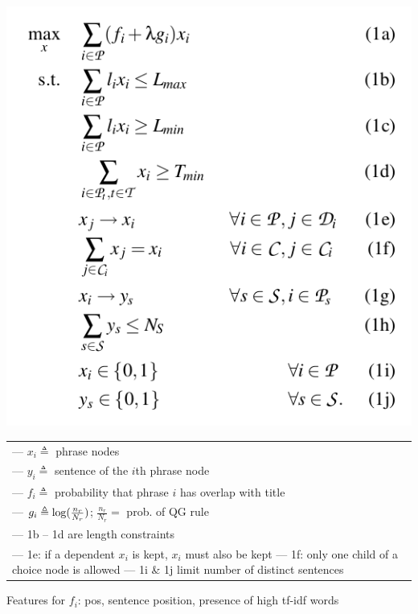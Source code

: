 \documentclass[xcolor={table}]{beamer}
\begin{document}
\begin{frame}[t]{\cite{woodsend2010generation}}
      \includegraphics[scale=.23]{images/ilp-woodsend10}  
      \begin{tabular}{p{6.5cm}}
        --- $x_i \triangleq$ phrase nodes\\
        --- $y_i \triangleq$ sentence of the $i$th phrase node\\
        --- $f_i \triangleq$ probability that phrase $i$ has overlap with title  \\
        --- $g_i \triangleq \log \Large( \frac{n_r}{N_r}\Large)$; $\frac{n_r}{N_r} = $ prob. of QG rule\\
        --- 1b -- 1d are length constraints  \\
        --- 1e: if a dependent $x_i$ is kept, $x_i$ must also be kept
        --- 1f: only one child of a choice node is allowed
        --- 1i \& 1j limit number of distinct sentences
        
        

      \end{tabular}

      Features for $f_i$: pos, sentence position, 
        presence of high tf-idf words 
\end{frame}
\end{document}
